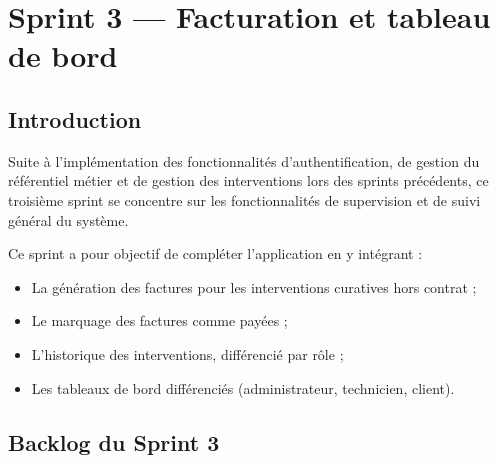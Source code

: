 \newpage
\pagestyle{fancy}
\renewcommand{\headrulewidth}{0.5pt}
\renewcommand{\footrulewidth}{0.5pt}
\chapter{Sprint 3 --- Facturation et tableau de bord}\setlength{\headheight}{28pt}
\label{ch5}
\thispagestyle{empty}
\minitoc
\newpage

\section{Introduction}

Suite à l'implémentation des fonctionnalités d'authentification, de gestion du référentiel métier et
de gestion des interventions lors des sprints précédents, ce troisième sprint se concentre sur les
fonctionnalités de supervision et de suivi général du système.

Ce sprint a pour objectif de compléter l'application en y intégrant :

\begin{itemize}
    \item La génération des factures pour les interventions curatives hors contrat ;
    \item Le marquage des factures comme payées ;
    \item L'historique des interventions, différencié par rôle ;
    \item Les tableaux de bord différenciés (administrateur, technicien, client).
\end{itemize}

\section{Backlog du Sprint 3}

